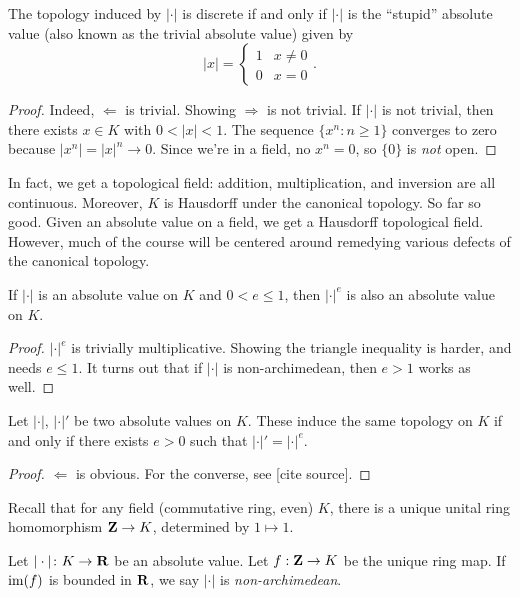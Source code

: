 \begin{lemma}
The topology induced by $|\cdot|$ is discrete if and only if $|\cdot|$ is 
the ``stupid'' absolute value (also known as the trivial absolute value) 
given by 
\[
  |x|=\begin{cases} 1 & x\ne 0 \\ 0 & x=0 \end{cases} .
\]
\end{lemma}
\begin{proof}
Indeed, $\Leftarrow$ is trivial. Showing $\Rightarrow$ is not trivial. If 
$|\cdot|$ is not trivial, then there exists $x\in K$ with 
$0<|x|<1$. The sequence $\{x^n:n\geqslant 1\}$ converges to zero because 
$|x^n|=|x|^n\to 0$. Since we're in a field, no $x^n=0$, so $\{0\}$ is 
\emph{not} open. 
\end{proof}

In fact, we get a topological field: addition, multiplication, and inversion 
are all continuous. Moreover, $K$ is Hausdorff under the canonical topology. 
So far so good. Given an absolute value on a field, we get a Hausdorff topological 
field. However, much of the course will be centered around remedying various 
defects of the canonical topology. 

\begin{lemma}
If $|\cdot|$ is an absolute value on $K$ and $0<e\leqslant 1$, then 
$|\cdot|^e$ is also an absolute value on $K$. 
\end{lemma}
\begin{proof}
$|\cdot|^e$ is trivially multiplicative. Showing the triangle inequality 
is harder, and needs $e\leqslant 1$. It turns out that if $|\cdot|$ is 
non-archimedean, then $e>1$ works as well. 
\end{proof}

\begin{theorem}
Let $|\cdot|$, $|\cdot|'$ be two absolute values on $K$. These induce the 
same topology on $K$ if and only if there exists $e>0$ such that 
$|\cdot|'=|\cdot|^e$. 
\end{theorem}
\begin{proof}
$\Leftarrow$ is obvious. For the converse, see [cite source]. 
\end{proof}

Recall that for any field (commutative ring, even) $K$, there is a unique 
unital ring homomorphism $\mathbf{Z}\to K$, determined by $1\mapsto 1$. 

\begin{definition}
Let $|\cdot|\colon K\to \mathbf{R}$ be an absolute value. Let $f:\mathbf{Z}\to K$ be the 
unique ring map. If $\operatorname{im}(f)$ is bounded in $\mathbf{R}$, we say $|\cdot|$ is 
\emph{non-archimedean}. 
\end{definition}

